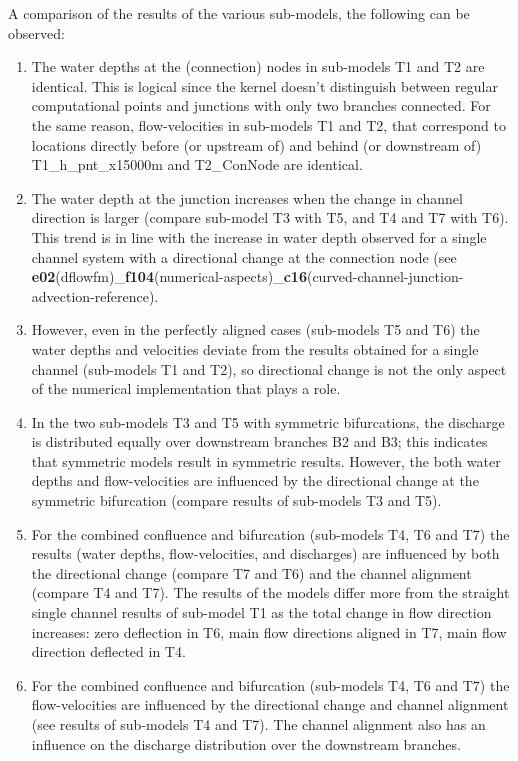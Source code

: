 A comparison of the results of the various sub-models, the following can be observed:

\begin{enumerate}
\item The water depths at the (connection) nodes in sub-models T1 and T2 are identical.
This is logical since the kernel doesn't distinguish between regular computational points and junctions with only two branches connected.
For the same reason, flow-velocities in sub-models T1 and T2, that correspond to locations directly before (or upstream of) and behind (or downstream of) T1\_h\_pnt\_x15000m and T2\_ConNode are identical.
\item The water depth at the junction increases when the change in channel direction is larger (compare sub-model T3 with T5, and T4 and T7 with T6).
This trend is in line with the increase in water depth observed for a single channel system with a directional change at the connection node (see \textbf{e02}(dflowfm)\_\textbf{f104}(numerical-aspects)\_\textbf{c16}(curved-channel-junction-advection-reference).
\item However, even in the perfectly aligned cases (sub-models T5 and T6) the water depths and velocities deviate from the results obtained for a single channel (sub-models T1 and T2), so directional change is not the only aspect of the numerical implementation that plays a role.
\item In the two sub-models T3 and T5 with symmetric bifurcations, the discharge is distributed equally over downstream branches B2 and B3; this indicates that symmetric models result in symmetric results.
However, the both water depths and flow-velocities are influenced by the directional change at the symmetric bifurcation (compare results of sub-models T3 and T5).
\item For the combined confluence and bifurcation (sub-models T4, T6 and T7) the results (water depths, flow-velocities, and discharges) are influenced by both the directional change (compare T7 and T6) and the channel alignment (compare T4 and T7).
The results of the models differ more from the straight single channel results of sub-model T1 as the total change in flow direction increases: zero deflection in T6, main flow directions aligned in T7, main flow direction deflected in T4.
\item For the combined confluence and bifurcation (sub-models T4, T6 and T7) the flow-velocities are influenced by the directional change and channel alignment (see results of sub-models T4 and T7).
The channel alignment also has an influence on the discharge distribution over the downstream branches.
\end{enumerate}

